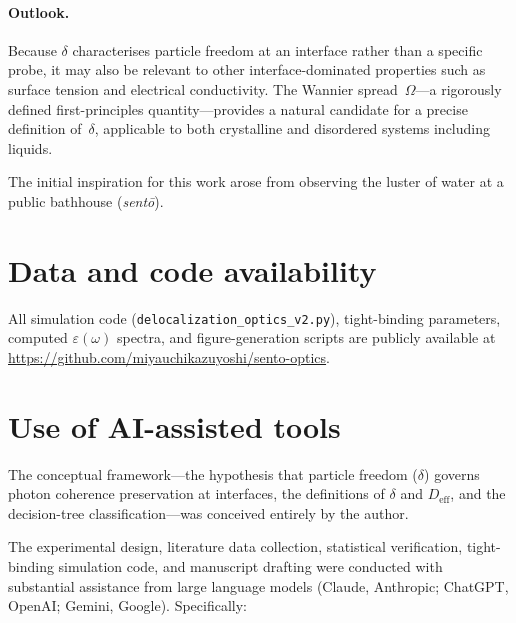 \documentclass[twocolumn,showpacs,preprintnumbers,amsmath,amssymb,prb]{revtex4-2}
\begin{document}
\paragraph{Outlook.}
Because $\delta$ characterises particle freedom at an interface rather
than a specific probe, it may also be relevant to other
interface-dominated properties such as surface tension and
electrical conductivity. The Wannier spread~$\Omega$---a rigorously
defined first-principles quantity---provides a natural candidate for
a precise definition of~$\delta$, applicable to both crystalline and
disordered systems including liquids.

\begin{acknowledgments}
The initial inspiration for this work arose from observing the luster
of water at a public bathhouse (\textit{sent\=o}).
\end{acknowledgments}

\section*{Data and code availability}

All simulation code (\texttt{delocalization\_optics\_v2.py}),
tight-binding parameters, computed $\varepsilon(\omega)$ spectra,
and figure-generation scripts are publicly available at
\url{https://github.com/miyauchikazuyoshi/sento-optics}.

\section*{Use of AI-assisted tools}

The conceptual framework---the hypothesis that particle freedom
($\delta$) governs photon coherence preservation at interfaces, the
definitions of $\delta$ and $D_\mathrm{eff}$, and the decision-tree
classification---was conceived entirely by the author.

The experimental design, literature data collection, statistical
verification, tight-binding simulation code, and manuscript drafting
were conducted with substantial assistance from large language models
(Claude, Anthropic; ChatGPT, OpenAI; Gemini, Google). Specifically:
\end{document}
